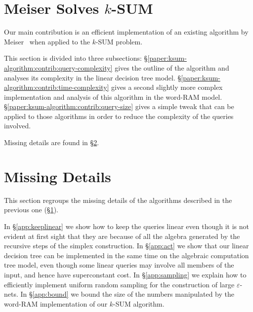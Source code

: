 \section{Meiser Solves \(k\)-SUM}\label{paper:ksum-algorithm:proofs}

Our main contribution is an efficient implementation of an
existing algorithm by Meiser~\cite{M93} when applied to the \(k\)-SUM problem.

This section is divided into three subsections:
\S\ref{paper:ksum-algorithm:contrib:query-complexity} gives the outline of the
algorithm and analyses its complexity in the linear decision tree model.
\S\ref{paper:ksum-algorithm:contrib:time-complexity} gives a second
slightly more complex implementation and analysis of this algorithm in the word-RAM
model. \S\ref{paper:ksum-algorithm:contrib:query-size} gives a simple
tweak that can be applied to those algorithms in order to reduce the complexity
of the queries involved.

Missing details are found in \S\ref{paper:ksum-algorithm:details}.





\section{Missing Details}\label{paper:ksum-algorithm:details}

This section regroups the missing details of the algorithms described in the
previous one (\S\ref{paper:ksum-algorithm:proofs}).

In \S\ref{app:keeplinear} we show how to keep the queries linear even though it
is not evident at first sight that they are because of all the algebra
generated by the recursive steps of the simplex construction.
%
In \S\ref{app:act} we show that our linear decision tree can be implemented in
the same time on the algebraic computation tree model, even though some linear
queries may involve all members of the input, and hence have superconstant
cost.
%
In \S\ref{app:sampling} we explain how to efficiently implement uniform random sampling
for the construction of large \(\varepsilon\)-nets.
%
In \S\ref{app:bound} we bound the size of the numbers manipulated by the
word-RAM implementation of our \(k\)-SUM algorithm.





